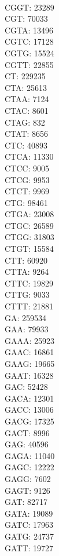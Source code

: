 \begin{multicols}{7}
\\ CGGT:	23289
\\ CGT:	70033
\\ CGTA:	13496
\\ CGTC:	17128
\\ CGTG:	15524
\\ CGTT:	22855
\\ CT:	229235
\\ CTA:	25613
\\ CTAA:	7124
\\ CTAC:	8601
\\ CTAG:	832
\\ CTAT:	8656
\\ CTC:	40893
\\ CTCA:	11330
\\ CTCC:	9005
\\ CTCG:	9953
\\ CTCT:	9969
\\ CTG:	98461
\\ CTGA:	23008
\\ CTGC:	26589
\\ CTGG:	31803
\\ CTGT:	15584
\\ CTT:	60920
\\ CTTA:	9264
\\ CTTC:	19829
\\ CTTG:	9033
\\ CTTT:	21881
\\ GA:	259534
\\ GAA:	79933
\\ GAAA:	25923
\\ GAAC:	16861
\\ GAAG:	19665
\\ GAAT:	16328
\\ GAC:	52428
\\ GACA:	12301
\\ GACC:	13006
\\ GACG:	17325
\\ GACT:	8996
\\ GAG:	40596
\\ GAGA:	11040
\\ GAGC:	12222
\\ GAGG:	7602
\\ GAGT:	9126
\\ GAT:	82717
\\ GATA:	19089
\\ GATC:	17963
\\ GATG:	24737
\\ GATT:	19727

\end{multicols}
